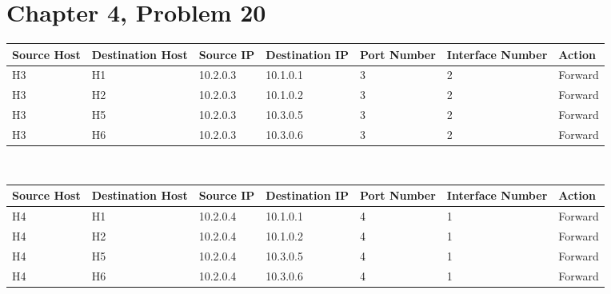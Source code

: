 \documentclass{article}
\begin{document}
\section*{Chapter 4, Problem 20}
\begin{tabular}{ |l|l|l|l|l|l|l| }
  \hline
  Source Host & Destination Host & Source IP & Destination IP & Port Number & Interface Number & Action \\ \hline
      H3 & H1 & 10.2.0.3 & 10.1.0.1 & 3 & 2 & Forward \\ \hline
      H3 & H2 & 10.2.0.3 & 10.1.0.2 & 3 & 2 & Forward \\ \hline
      H3 & H5 & 10.2.0.3 & 10.3.0.5 & 3 & 2 & Forward \\ \hline
      H3 & H6 & 10.2.0.3 & 10.3.0.6 & 3 & 2 & Forward \\ \hline
\end{tabular}
\newline \\
\begin{tabular}{ |l|l|l|l|l|l|l| }
  \hline
  Source Host & Destination Host & Source IP & Destination IP & Port Number & Interface Number & Action \\ \hline
      H4 & H1 & 10.2.0.4 & 10.1.0.1 & 4 & 1 & Forward \\ \hline
      H4 & H2 & 10.2.0.4 & 10.1.0.2 & 4 & 1 & Forward \\ \hline
      H4 & H5 & 10.2.0.4 & 10.3.0.5 & 4 & 1 & Forward \\ \hline
      H4 & H6 & 10.2.0.4 & 10.3.0.6 & 4 & 1 & Forward \\ \hline
\end{tabular}
\end{document}

